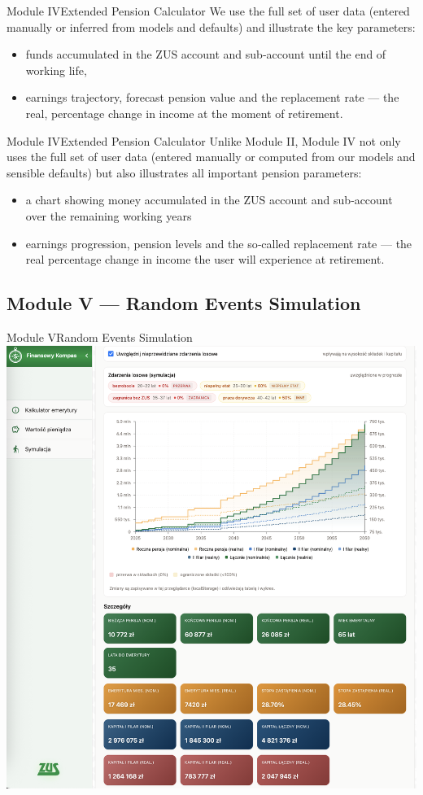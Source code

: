 \begin{frame}[t]{Module IV}{Extended Pension Calculator}
We use the full set of user data (entered manually or inferred from models and defaults)
and illustrate the key parameters:
\begin{itemize}
  \pause
  \item funds accumulated in the ZUS account and sub‑account until the end of working life,
  \pause
  \item earnings trajectory, forecast pension value and the replacement rate —
        the real, percentage change in income at the moment of retirement.
\end{itemize}
\end{frame}

\begin{frame}[t]{Module IV}{Extended Pension Calculator}
Unlike Module II, Module IV not only uses the full set of user data
(entered manually or computed from our models and sensible defaults)
but also illustrates all important pension parameters:

\begin{itemize}
    \pause
    \item a chart showing money accumulated in the ZUS account and sub‑account over the remaining working years
    \pause
    \item earnings progression, pension levels and the so‑called replacement rate — the real percentage change
    in income the user will experience at retirement.
\end{itemize}
\end{frame}

\subsection{Module V --- Random Events Simulation}

\begin{frame}[t]{Module V}{Random Events Simulation}
  \includegraphics[width=.8\textwidth]{img/module_5_random_events}
\end{frame}

